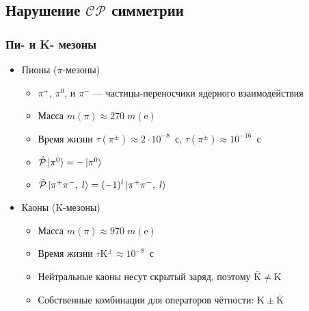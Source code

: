 \subsection{Нарушение $\mathcal{CP}$ симметрии}
\begin{frame}
    \frametitle{Пи- и K- мезоны}
    \begin{itemize}[<+->]
    \item Пионы ($\pi$-мезоны)
        \begin{itemize}[<+->]
        \item $\pi^+$, $\pi^0$, и $\pi^-$ --- частицы-переносчики ядерного
        взаимодействия
        \item Масса $m (\pi) \approx 270\; m (\text{e})$
        \item Время жизни $\tau (\pi^\pm) \approx 2 \cdot 10^{-8}$~с,
            $\tau (\pi^\pm) \approx 10^{-16}$~с
        \item $\hat{\mathcal{P}} \ket{\pi^0} = - \ket{\pi^0}$
        \item $\hat{\mathcal{P}} \ket{\pi^+\pi^-,\;l} = (-1)^l
            \ket{\pi^+ \pi^-,\;l}$
        \end{itemize}
    \item Каоны (K-мезоны)
        \begin{itemize}[<+->]
        \item Масса $m (\pi) \approx 970\; m (\text{e})$
        \item Время жизни $\tau \text{K}^\pm \approx 10^{-8}$~с
        \item Нейтральные каоны несут скрытый заряд, поэтому
            $\bar{\text{K}} \ne \text {K}$
        \item Собственные комбинации для операторов чётности:
            $\text{K} \pm \bar{\text{K}}$
        \end{itemize}
    \end{itemize}
\end{frame}
